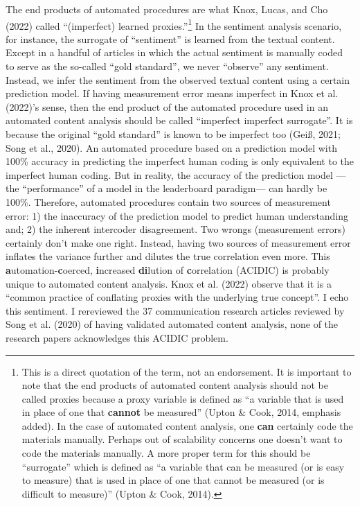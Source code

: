 \documentclass[english,man,floatsintext]{apa6}
\begin{document}
The end products of automated procedures are what Knox, Lucas, and Cho (2022) called \enquote{(imperfect) learned proxies.}\footnote{This is a direct quotation of the term, not an endorsement. It is important to note that the end products of automated content analysis should not be called proxies because a proxy variable is defined as \enquote{a variable that is used in place of one that \textbf{cannot} be measured} (Upton \& Cook, 2014, emphasis added). In the case of automated content analysis, one \textbf{can} certainly code the materials manually. Perhaps out of scalability concerns one doesn't want to code the materials manually. A more proper term for this should be \enquote{surrogate} which is defined as \enquote{a variable that can be measured (or is easy to measure) that is used in place of one that cannot be measured (or is difficult to measure)} (Upton \& Cook, 2014).} In the sentiment analysis scenario, for instance, the surrogate of \enquote{sentiment} is learned from the textual content. Except in a handful of articles in which the actual sentiment is manually coded to serve as the so-called \enquote{gold standard}, we never \enquote{observe} any sentiment. Instead, we infer the sentiment from the observed textual content using a certain prediction model. If having measurement error means imperfect in Knox et al. (2022)'s sense, then the end product of the automated procedure used in an automated content analysis should be called \enquote{imperfect imperfect surrogate}. It is because the original \enquote{gold standard} is known to be imperfect too (Geiß, 2021; Song et al., 2020). An automated procedure based on a prediction model with 100\% accuracy in predicting the imperfect human coding is only equivalent to the imperfect human coding. But in reality, the accuracy of the prediction model ---the \enquote{performance} of a model in the leaderboard paradigm--- can hardly be 100\%. Therefore, automated procedures contain two sources of measurement error: 1) the inaccuracy of the prediction model to predict human understanding and; 2) the inherent intercoder disagreement. Two wrongs (measurement errors) certainly don't make one right. Instead, having two sources of measurement error inflates the variance further and dilutes the true correlation even more. This \textbf{a}utomation-\textbf{c}oerced, \textbf{i}ncreased \textbf{di}lution of \textbf{c}orrelation (ACIDIC) is probably unique to automated content analysis. Knox et al. (2022) observe that it is a \enquote{common practice of conflating proxies with the underlying true concept}. I echo this sentiment. I rereviewed the 37 communication research articles reviewed by Song et al. (2020) of having validated automated content analysis, none of the research papers acknowledges this ACIDIC problem.
\end{document}
